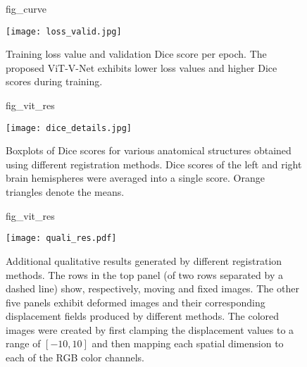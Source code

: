 \documentclass{midl}
\begin{document}
\newpage
\begin{figure}[!htp]
\floatconts
{fig_curve}
  {\caption{Training loss value and validation Dice score per epoch. The proposed ViT-V-Net exhibits lower loss values and higher Dice scores during training.}}
  {\texttt{[image: loss\_valid.jpg]}}
\end{figure}

\begin{figure}[!hbp]
\floatconts
{fig_vit_res}
  {\caption{Boxplots of Dice scores for various anatomical structures obtained using different registration methods. Dice scores of the left and right brain hemispheres were averaged into a single score. Orange triangles denote the means.}}
  {\texttt{[image: dice\_details.jpg]}}
\end{figure}
\newpage
\vspace{-4mm}
\begin{figure}[!htp]
\floatconts
{fig_vit_res}
  {\vspace{-4mm}\caption{Additional qualitative results generated by different registration methods. The rows in the top panel (of two rows separated by a dashed line) show, respectively, moving and fixed images. The other five panels exhibit deformed images and their corresponding displacement fields produced by different methods. The colored images were created by first clamping the displacement values to a range of $[-10, 10]$ and then mapping each spatial dimension to each of the RGB color channels.}}
  {\texttt{[image: quali\_res.pdf]}}
  
\end{figure}



\let\cleardoublepage\clearpage
\end{document}
